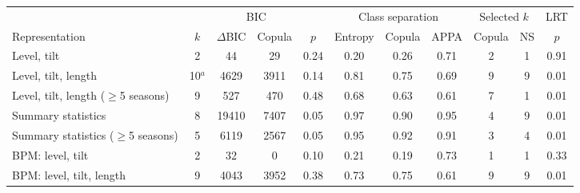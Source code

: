 \begin{tabular}{lcccccccccc}\toprule
 & \multicolumn{4}{c}{BIC} & \multicolumn{3}{c}{Class separation} & \multicolumn{2}{c}{Selected $k$} & LRT \\ \cmidrule(lr){2-5}\cmidrule(lr){6-8}\cmidrule(lr){9-10}\cmidrule(lr){11-11}
Representation & $k$ & $\Delta$BIC & Copula & $p$ & Entropy & Copula & APPA & Copula & NS & $p$ \\ \midrule
Level, tilt & 2 & 44 & 29 & 0.24 & 0.20 & 0.26 & 0.71 & 2 & 1 & 0.91 \\
Level, tilt, length & 10$^a$ & 4629 & 3911 & 0.14 & 0.81 & 0.75 & 0.69 & 9 & 9 & 0.01 \\
Level, tilt, length ($\ge$5 seasons) & 9 & 527 & 470 & 0.48 & 0.68 & 0.63 & 0.61 & 7 & 1 & 0.01 \\
Summary statistics & 8 & 19410 & 7407 & 0.05 & 0.97 & 0.90 & 0.95 & 4 & 9 & 0.01 \\
Summary statistics ($\ge$5 seasons) & 5 & 6119 & 2567 & 0.05 & 0.95 & 0.92 & 0.91 & 3 & 4 & 0.01 \\
BPM: level, tilt & 2 & 32 & 0 & 0.10 & 0.21 & 0.19 & 0.73 & 1 & 1 & 0.33 \\
BPM: level, tilt, length & 9 & 4043 & 3952 & 0.38 & 0.73 & 0.75 & 0.61 & 9 & 9 & 0.01 \\
\bottomrule\end{tabular}